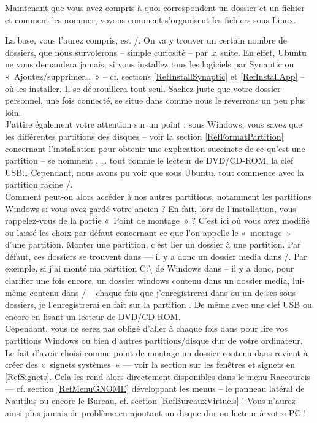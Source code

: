 Maintenant que vous avez compris à quoi correspondent un dossier et un fichier et comment les nommer, voyons comment s'organisent les fichiers sous Linux.\par
La base, vous l'aurez compris, est /. On va y trouver un certain nombre de dossiers, que nous survolerons -- simple curiosité -- par la suite. En effet, Ubuntu ne vous demandera jamais, si vous installez tous les logiciels par Synaptic ou «~Ajoutez/supprimer\ldots{}~» -- cf. sections \ref{RefInstallSynaptic} et \ref{RefInstallApp} -- où les installer. Il se débrouillera tout seul. Sachez juste que votre dossier personnel, une fois connecté, se situe dans  comme nous le reverrons un peu plus loin.\\
J'attire également votre attention sur un point : sous Windows, vous savez que les différentes partitions des disques -- voir la section \ref{RefFormatPartition} concernant l'installation pour obtenir une explication succincte de ce qu'est une partition -- se nomment , \ldots{} tout comme le lecteur de DVD/CD-ROM, la clef USB\ldots{} Cependant, nous avons pu voir que sous Ubuntu, tout commence avec la partition racine /.\\
Comment peut-on alors accéder à nos autres partitions, notamment les partitions Windows si vous avez gardé votre ancien  ? En fait, lors de l'installation, vous rappelez-vous de la partie «~Point de montage~» ? C'est ici où vous avez modifié ou laissé les choix par défaut concernant ce que l'on appelle le «~montage~» d'une partition. Monter une partition, c'est lier un dossier à une partition. Par défaut, ces dossiers se trouvent dans  --- il y a donc un dossier media dans /. Par exemple, si j'ai monté ma partition C:\textbackslash{} de Windows dans  -- il y a donc, pour clarifier une fois encore, un dossier windows contenu dans un dossier media, lui-même contenu dans / -- chaque fois que j'enregistrerai dans  ou un de ses sous-dossiers, je l'enregistrerai en fait sur la partition . De même avec une clef USB ou encore en lisant un lecteur de DVD/CD-ROM.\\
Cependant, vous ne serez pas obligé d'aller à chaque fois dans  pour lire vos partitions Windows ou bien d'autres partitions/disque dur de votre ordinateur. Le fait d'avoir choisi comme point de montage un dossier contenu dans  revient à créer des «~signets systèmes~» --- voir la section sur les fenêtres et signets en \ref{RefSignets}. Cela les rend alors directement disponibles dans le menu Raccourcis --- cf. section \ref{RefMenuGNOME} développant les menus -- le panneau latéral de Nautilus ou encore le Bureau, cf. section \ref{RefBureauxVirtuels} ! Vous n'aurez ainsi plus jamais de problème en ajoutant un disque dur ou lecteur à votre PC !\par
